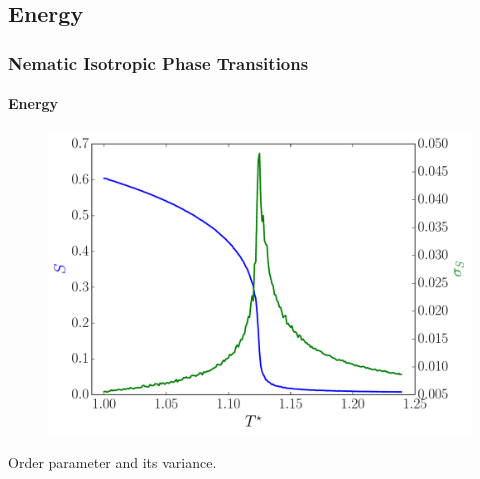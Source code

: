 \documentclass{beamer}
\begin{document}
\subsection{Energy}
\begin{frame}
	\frametitle{Nematic Isotropic Phase Transitions}
	\framesubtitle{Energy}

\begin{figure}
\includegraphics[scale=0.48]{figures/local_order.pdf}
\end{figure}
\vspace{-0.6cm}
\center Order parameter and its variance.
\end{frame}
\end{document}
